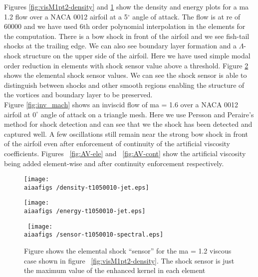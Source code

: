  Figures \ref{fig:visM1pt2-density} and \ref{fig:visM1pt2-energy} show the density and energy plots for a \gls{ma} 1.2 flow over a NACA 0012 airfoil at a 5$^{\circ}$ angle of attack. The flow is at \gls{re} of 60000 and we have used 6th order polynomial interpolation in the elements for the computation. There is a bow shock in front of the airfoil and we see fish-tail shocks at the trailing edge. We can also see boundary layer formation and a $\Lambda$-shock structure on the upper side of the airfoil. Here we have used simple modal order reduction in elements with shock sensor value above a threshold. Figure \ref{fig:sensor} shows the elemental shock sensor values. We can see the shock sensor is able to distinguish between shocks and other smooth regions enabling the structure of the vortices and boundary layer to be preserved. \\
 
 Figure \ref{fig:inv_mach} shows an inviscid flow of \gls{ma} = 1.6 over a NACA 0012 airfoil at $0^{\circ}$ angle of attack on a triangle mesh. Here we use Persson and Peraire's method  for shock detection and can see that we the shock has been detected and captured well. A few oscillations still remain near the strong bow shock in front of the airfoil even after enforcement of continuity of the artificial viscosity coefficients. Figures ~\ref{fig:AV-ele} and ~\ref{fig:AV-cont} show the artificial viscosity being added element-wise and after continuity enforcement respectively.

\begin{figure}
\centering
\begin{minipage}[t]{.5\textwidth}
  \centering
  \texttt{[image: \\aiaafigs /density-t1050010-jet.eps]}
  \label{fig:visM1pt2-density}
\end{minipage}%
\begin{minipage}[t]{.5\textwidth}
  \centering
  \texttt{[image: \\aiaafigs /energy-t1050010-jet.eps]}
  \label{fig:visM1pt2-energy}
\end{minipage}
\end{figure} 

\begin{figure}[h] \tt
\centering
\texttt{[image: \\aiaafigs /sensor-t1050010-spectral.eps]}
\caption{Figure shows the elemental shock ``sensor'' for the \gls{ma} = 1.2 viscous case shown in figure ~\ref{fig:visM1pt2-density}. The shock sensor is just the maximum value of the enhanced kernel in each element}
\label{fig:sensor}
\end{figure}

